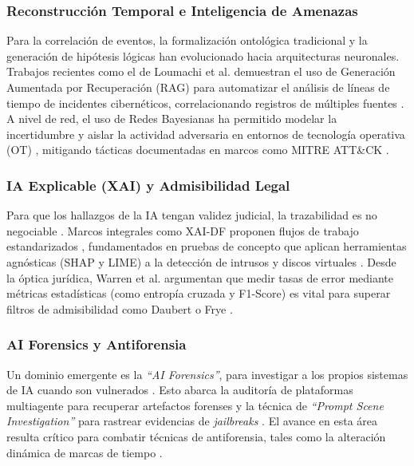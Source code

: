 \documentclass[journal]{IEEEtran}
\begin{document}
\subsubsection{Reconstrucción Temporal e Inteligencia de Amenazas}
Para la correlación de eventos, la formalización ontológica tradicional \cite{ChabotYoan2014Acfk} y la generación de hipótesis lógicas \cite{CostantiniStefania2015DFEA} han evolucionado hacia arquitecturas neuronales. Trabajos recientes como el de Loumachi et al. demuestran el uso de Generación Aumentada por Recuperación (RAG) para automatizar el análisis de líneas de tiempo de incidentes cibernéticos, correlacionando registros de múltiples fuentes \cite{LoumachiFatmaYasmine2025ACIT}. A nivel de red, el uso de Redes Bayesianas ha permitido modelar la incertidumbre y aislar la actividad adversaria en entornos de tecnología operativa (OT) \cite{MaccaroneLeeT.2025IACi}, mitigando tácticas documentadas en marcos como MITRE ATT\&CK \cite{MundtMichael2022TMoD}.

\subsubsection{IA Explicable (XAI) y Admisibilidad Legal}
Para que los hallazgos de la IA tengan validez judicial, la trazabilidad es no negociable \cite{10.1145/3560107.3560114}. Marcos integrales como XAI-DF proponen flujos de trabajo estandarizados \cite{KhalidZainab2024TauX}, fundamentados en pruebas de concepto que aplican herramientas agnósticas (SHAP y LIME) a la detección de intrusos y discos virtuales \cite{HermosillaPamela2025EAfF, HermosillaPamela2025UoEA, HallStuartW.2022APoC}. Desde la óptica jurídica, Warren et al. argumentan que medir tasas de error mediante métricas estadísticas (como entropía cruzada y F1-Score) es vital para superar filtros de admisibilidad como Daubert o Frye \cite{WarrenEricM.2025Ceal}.

\subsubsection{AI Forensics y Antiforensia}
Un dominio emergente es la \textit{``AI Forensics''}, para investigar a los propios sistemas de IA cuando son vulnerados \cite{alma991005936804107681}. Esto abarca la auditoría de plataformas multiagente para recuperar artefactos forenses \cite{10.1145/3664476.3670908} y la técnica de \textit{``Prompt Scene Investigation''} para rastrear evidencias de \textit{jailbreaks} \cite{10.1145/3774905.3795469}. El avance en esta área resulta crítico para combatir técnicas de antiforensia, tales como la alteración dinámica de marcas de tiempo \cite{10.1145/3712716.3712727}.
\end{document}
